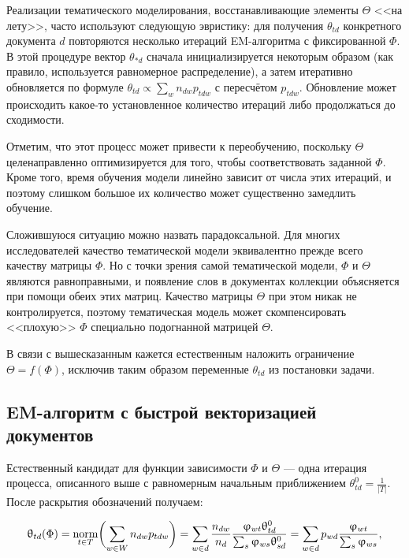 Реализации тематического моделирования, восстанавливающие элементы $\Theta$ <<на лету>>, часто используют следующую эвристику: для получения $\theta_{td}$ конкретного документа $d$ повторяются несколько итераций EM-алгоритма с фиксированной $\Phi$. В этой процедуре вектор $\theta_{\ast d}$ сначала инициализируется некоторым образом (как правило, используется равномерное распределение), а затем итеративно обновляется по формуле $\theta_{td}  \propto \sum_{w} n_{dw} p_{tdw}$ с пересчётом $p_{tdw}$. Обновление может происходить какое-то установленное количество итераций либо продолжаться до сходимости.

Отметим, что этот процесс может привести к переобучению, поскольку $\Theta$ целенаправленно оптимизируется для того, чтобы соответствовать заданной $\Phi$. Кроме того, время обучения модели линейно зависит от числа этих итераций, и поэтому слишком большое их количество может существенно замедлить обучение.

Сложившуюся ситуацию можно назвать парадоксальной. Для многих исследователей качество тематической модели эквивалентно прежде всего качеству матрицы $\Phi$. Но с точки зрения самой тематической модели, $\Phi$ и $\Theta$ являются равноправными, и появление слов в документах коллекции объясняется при помощи обеих этих матриц. Качество матрицы $\Theta$ при этом никак не контролируется, поэтому тематическая модель может скомпенсировать <<плохую>> $\Phi$ специально подогнанной матрицей $\Theta$.

В связи с вышесказанным кажется естественным наложить ограничение $\Theta = f(\Phi)$, исключив таким образом переменные $\theta_{td}$ из постановки задачи. 

\subsection{EM-алгоритм с быстрой векторизацией документов}

Естественный кандидат для функции зависимости $\Phi$ и $\Theta$ --- одна итерация процесса, описанного выше с равномерным начальным приближением $\theta^0_{td} = \frac1{|T|}$. После раскрытия обозначений получаем:

\begin{equation}
\label{eq:thetaform}
    \uptheta_{td}(\Phi)
    = \mathop{\mathrm{norm}}\limits_{t\in T} \biggl( \sum_{w\in W} n_{dw} p_{tdw} \biggr)
    = \sum_{w\in d} \frac{n_{dw}}{n_d} \frac{\upvarphi_{wt} \uptheta^0_{td}}{\sum_s \upvarphi_{ws} \uptheta^0_{sd}}
    = \sum_{w\in d} p_{wd} \frac{\upvarphi_{wt}}{\sum_s \upvarphi_{ws}},
\end{equation}

